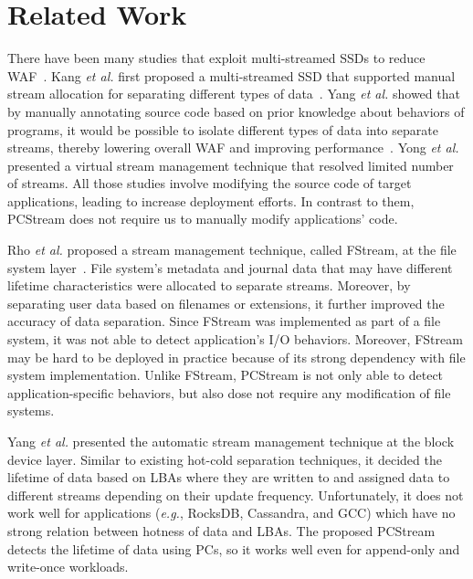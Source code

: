 \section{Related Work}
There have been many studies that exploit multi-streamed SSDs to reduce
WAF~\cite{MultiStream, Level, vStream, FStream, AutoStream, PCStream}.  Kang
{\it et al.} first proposed a multi-streamed SSD that supported manual stream
allocation for separating different types of data~\cite{MultiStream}.  Yang
{\it et al.} showed that by manually annotating source code based on prior
knowledge about behaviors of programs, it would be possible to isolate
different types of data into separate streams, thereby lowering overall WAF and
improving performance~\cite{Level}.  Yong {\it et al.} presented a virtual
stream management technique that resolved limited number of streams.  All those
studies involve modifying the source code of target applications, leading to
increase deployment efforts.  In contrast to them, PCStream does not require us
to manually modify applications' code.

Rho {\it et al.} proposed a stream management technique, called FStream, at the
file system layer~\cite{FStream}. File system's metadata and journal data that
may have different lifetime characteristics were allocated to separate streams.
Moreover, by separating user data based on filenames or extensions, it further
improved the accuracy of data separation. Since FStream was implemented as part
of a file system, it was not able to detect application's I/O behaviors.
Moreover, FStream may be hard to be deployed in practice because of its strong
dependency with file system implementation. Unlike FStream, PCStream is not
only able to detect application-specific behaviors, but also dose not require
any modification of file systems.

Yang {\it et al.} presented the automatic stream management technique at the
block device layer. Similar to existing hot-cold separation techniques, it
decided the lifetime of data based on LBAs where they are written to and
assigned data to different streams depending on their update frequency.
Unfortunately, it does not work well for applications ({\it e.g.}, RocksDB,
Cassandra, and GCC) which have no strong relation between hotness of data and
LBAs.  The proposed PCStream detects the lifetime of data using PCs, so it
works well even for append-only and write-once workloads.

